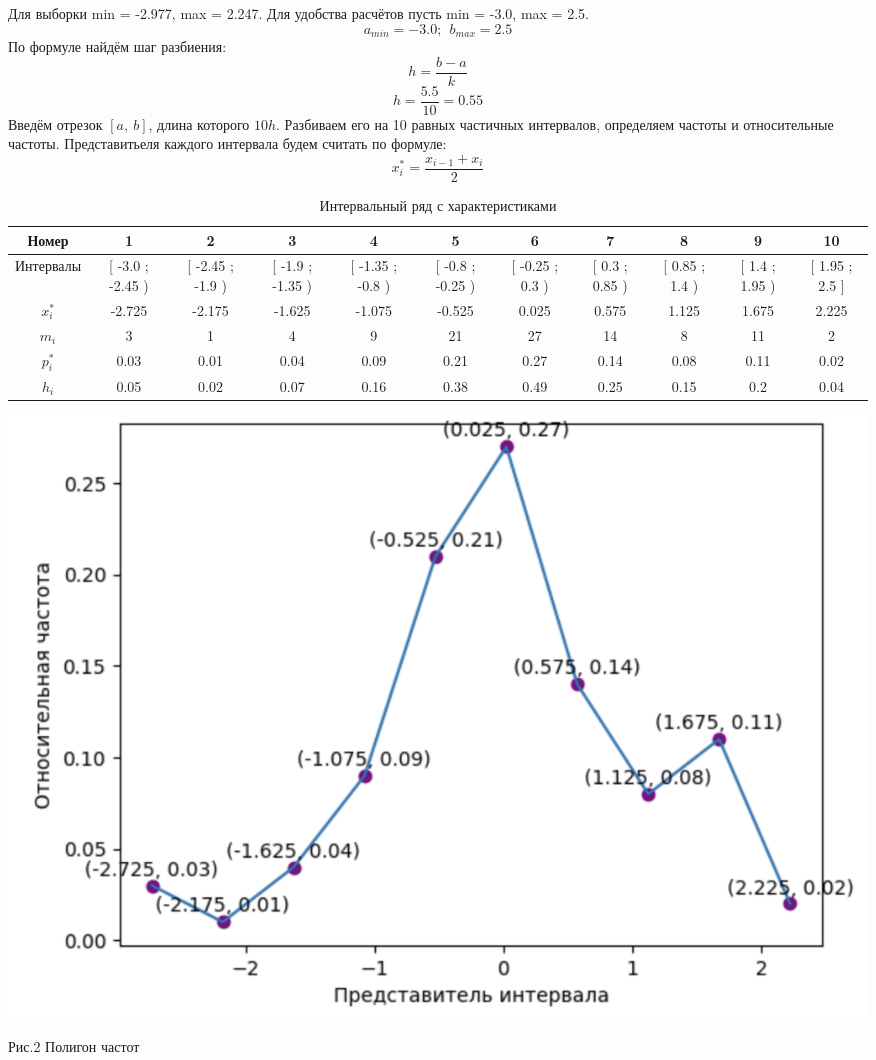 \documentclass{article}
\begin{document}
Для выборки min = -2.977, max = 2.247. 
Для удобства расчётов пусть min = -3.0, max = 2.5.
\begin{equation*}
    a_{min} = -3.0;\ \  b_{max} = 2.5 
\end{equation*}
По формуле найдём шаг разбиения:
\begin{equation}
    h = \frac{b-a}{k}
\end{equation}
\begin{equation*}
    h = \frac{5.5}{10} = 0.55
\end{equation*}
Введём отрезок $[a,\ b]$, длина которого $10h$. Разбиваем его на 10 равных частичных интервалов, определяем частоты и относительные частоты. Представитьеля каждого интервала будем считать по формуле:
\begin{equation}
    x_i^* = \frac{x_{i-1}+x_i}{2}
\end{equation}

\begin{table}[h]
    \scriptsize
    \begin{tabular}{|*{11}{c|}}
        \hline
        Номер & 1  & 2  & 3  & 4  & 5  & 6  & 7  & 8  & 9  & 10 \\
        \hline
        Интервалы &\tiny[ -3.0 ; -2.45 )& \tiny[ -2.45 ; -1.9 ) & \tiny[ -1.9 ; -1.35 ) & \tiny[ -1.35 ; -0.8 ) & \tiny[ -0.8 ; -0.25 ) & \tiny[ -0.25 ; 0.3 ) & \tiny[ 0.3 ; 0.85 ) & \tiny[ 0.85 ; 1.4 ) & \tiny[ 1.4 ; 1.95 ) & \tiny[ 1.95 ; 2.5 ] \\
        \hline
        $x_i^*$& -2.725 &-2.175 &-1.625 &-1.075 &-0.525 &0.025 &0.575 &1.125 &1.675 &2.225\\
        \hline
        $m_i$& 3 &1 &4 &9 &21 &27 &14 &8 &11 &2\\
        \hline
        $p_i^*$& 0.03 &0.01 &0.04 &0.09 &0.21 &0.27 &0.14 &0.08 &0.11 &0.02\\
        \hline
        $h_i$& 0.05 &0.02 &0.07 &0.16 &0.38 &0.49 &0.25 &0.15 &0.2 &0.04\\
        \hline
    \end{tabular}
    \caption{Интервальный ряд с характеристиками}
\end{table}
\begin{center}
    \includegraphics[width=.7\textwidth]{poligon.png}
\end{center} 
\begin{center}
    \small
    Рис.2 Полигон частот
\end{center} 
\newblock
\end{document}
